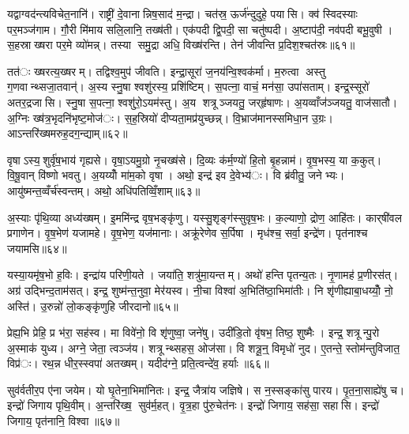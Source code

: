यद्वाग्वद॑न्त्यविचेत॒नानि॑। राष्ट्री॑ दे॒वानान्निष॒साद॑ म॒न्द्रा। चत॑स्र॒ ऊर्ज॑न्दुदुहे॒ पयासि। क्व॑ स्विदस्याः पर॒मञ्ज॑गाम। गौ॒री मि॑माय सलि॒लानि॒ तख्ष॑ती। एक॑पदी द्वि॒पदी॒ सा चतु॑ष्पदी। अ॒ष्टाप॑दी॒ नव॑पदी बभू॒वुषी। स॒हस्राख्षरा पर॒मे व्यो॑मन्न्। तस्या समु॒द्रा अधि॒ विख्ष॑रन्ति। तेन॑ जीवन्ति प्र॒दिश॒श्चत॑स्रः॥६१॥

तत॑ः ख्षरत्य॒ख्षरम्। तद्विश्व॒मुप॑ जीवति। इन्द्रा॒सूरा॑ ज॒नय॑न्वि॒श्वक॑र्मा। म॒रुत्वा अस्तु ग॒णवान्थ्सजा॒तवान्॑। अ॒स्य स्नु॒षा श्वशु॑रस्य॒ प्रशि॑ष्टिम्। स॒पत्ना॒ वाचं॒ मन॑सा॒ उपा॑सताम्। इन्द्र॒स्सूरो॑ अतर॒द्रजासि। स्नु॒षा स॒पत्ना॒ श्वशु॑रो॒ऽयम॑स्तु। अ॒य शत्रूञ्जयतु॒ जर्‌हृ॑षाणः। अ॒यव्वाँज॑ञ्जयतु॒ वाज॑सातौ। अ॒ग्निः ख्ष॑त्र॒भृदनि॑भृष्ट॒मोज॑ः। स॒ह॒स्रियो॑ दीप्यता॒मप्र॑युच्छन्न्। वि॒भ्राज॑मानस्समिधा॒न उ॒ग्रः। आऽन्तरि॑ख्षमरुह॒दग॒न्द्याम्॥६२॥


वृषाऽस्य॒शुर्वृ॑ष॒भाय॑ गृह्यसे। वृषा॒ऽयमु॒ग्रो नृ॒चख्ष॑से। दि॒व्यः क॑र्म॒ण्यो॑ हि॒तो बृ॒हन्नाम॑। वृ॒ष॒भस्य॒ या क॒कुत्। वि॒षू॒वान् वि॑ष्णो भवतु। अ॒यय्योँ मा॑म॒को वृषा। अथो॒ इन्द्र॑ इव दे॒वेभ्य॑ः। वि ब्र॑वीतु॒ जनेभ्यः। आयु॑ष्मन्त॒व्वँर्च॑स्वन्तम्। अथो॒ अधि॑पतिव्विँ॒शाम्॥६३॥

अ॒स्याः पृ॑थि॒व्या अध्य॑ख्षम्। इ॒ममि॑न्द्र वृष॒भङ्कृ॑णु। यस्सु॒शृङ्ग॑स्सुवृष॒भः। क॒ल्याणो॒ द्रोण॒ आहि॑तः। कार्‌षी॑वल प्रगाणेन। वृ॒ष॒भेण॑ यजामहे। वृ॒ष॒भेण॒ यज॑मानाः। अक्रू॑रेणेव स॒र्पिषा। मृध॑श्च॒ सर्वा॒ इन्द्रे॑ण। पृत॑नाश्च जयामसि॥६४॥

यस्या॒यमृ॑ष॒भो ह॒विः। इन्द्रा॑य परिणी॒यते। जया॑ति॒ शत्रु॑मा॒यन्तम्। अथो॑ हन्ति पृतन्य॒तः। नृ॒णामह॑ प्र॒णीरस॑त्। अग्र॑ उद्भिन्द॒ताम॑सत्। इन्द्र॒ शुष्म॑न्त॒नुवा॒ मेर॑यस्व। नी॒चा विश्वा॑ अ॒भिति॑ष्ठा॒भिमा॑तीः। नि शृ॑णीह्याबा॒धय्योँ॒ नो॒ अस्ति॑। उ॒रुन्नो॑ लो॒कङ्कृ॑णुहि जीरदानो॥६५॥

प्रेह्य॒भि प्रेहि॒ प्र भ॑रा॒ सह॑स्व। मा विवे॑नो॒ वि शृ॑णुष्वा॒ जने॑षु। उदी॑डि॒तो वृ॑षभ॒ तिष्ठ॒ शुष्मैः। इन्द्र॒ शत्रून्पु॒रो अ॒स्माक॑ युध्य। अग्ने॒ जेता॒ त्वञ्ज॑य। शत्रून्थ्सहस॒ ओज॑सा। वि शत्रू॒न्॒ विमृधो॑ नुद। ए॒तन्ते॒ स्तोम॑न्तुविजात॒ विप्र॑ः। रथ॒न्न धीर॒स्स्वपा॑ अतख्षम्। यदीद॑ग्ने॒ प्रति॒त्वन्दे॑व॒ हर्याः॥६६॥

सुव॑र्वतीर॒प ए॑ना जयेम। यो घृ॒तेना॒भिमा॑नितः। इन्द्र॒ जैत्रा॑य जज्ञिषे। स न॒स्सङ्का॑सु पारय। पृ॒त॒ना॒साह्ये॑षु च। इन्द्रो॑ जिगाय पृथि॒वीम्। अ॒न्तरि॑ख्ष॒ सुव॑र्म॒हत्। वृ॒त्र॒हा पु॑रु॒चेत॑नः। इन्द्रो॑ जिगाय॒ सह॑सा॒ सहासि। इन्द्रो॑ जिगाय॒ पृत॑नानि॒ विश्वा॥६७॥

